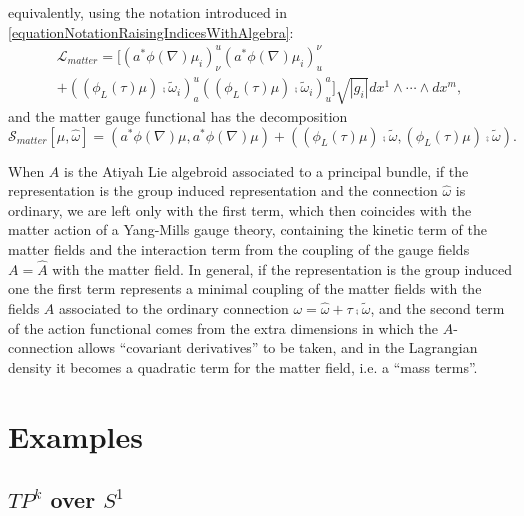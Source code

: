 equivalently, using the notation introduced in \eqref{equationNotationRaisingIndicesWithAlgebra}:
\begin{multline}
      \mathcal L_{matter} =
      [(a^*\phi(\nabla)\mu_i)_{\nu}^{u} (a^*\phi(\nabla)\mu_i)^{\nu}_{u} 
       \\
      + ((\phi_L(\tau) \mu)\comp \tilde \omega_i)_{a}^{u} ((\phi_L(\tau) \mu)\comp \tilde \omega_i)^{a}_{u}] \sqrt{|g_i|}dx^1 \wedge \cdots \wedge dx^m, 
\end{multline}
and the matter gauge functional has the decomposition
\begin{equation}\label{equationDecompositionGlobalMatterActionFUnctional}
    \mathcal S_{matter}[\mu, \hat \omega] = (a^* \phi(\nabla)\mu, a^* \phi(\nabla)\mu) 
    + ((\phi_L(\tau) \mu)\comp \tilde \omega, (\phi_L(\tau) \mu)\comp \tilde \omega).
\end{equation}

When $A$ is the Atiyah Lie algebroid associated to a principal bundle, if the representation is the group induced representation and the connection $\hat \omega$ is ordinary, we are left only with the first term, which then coincides with the matter action of a Yang-Mills gauge theory, containing the kinetic term of the matter fields and the interaction term from the coupling of the gauge fields $A = \hat A$ with the matter field. In general, if the representation is the group induced one the first term represents a minimal coupling of the matter fields with the fields $A$ associated to the ordinary connection $\omega = \hat \omega + \tau \comp \tilde \omega$, and the second term of the action functional comes from the extra dimensions in which the $A$-connection allows ``covariant derivatives'' to be taken, and in the Lagrangian density it becomes a quadratic term for the matter field, i.e. a ``mass terms''.

\section{Examples}

\subsection{$TP^k$ over $S^1$}

